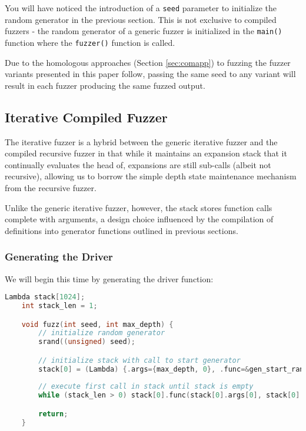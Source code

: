 \documentclass[8pt, twoside]{extarticle}
\begin{document}
You will have noticed the introduction of a \verb|seed| parameter to initialize the random generator in the previous section. This is not exclusive to compiled fuzzers - the random generator of a generic fuzzer is initialized in the \verb|main()| function where the \verb|fuzzer()| function is called. 

Due to the homologous approaches (Section \ref{sec:comapp}) to fuzzing the fuzzer variants presented in this paper follow, passing the same seed to any variant will result in each fuzzer producing the same fuzzed output.

\subsection{Iterative Compiled Fuzzer}

The iterative fuzzer is a hybrid between the generic iterative fuzzer and the compiled recursive fuzzer in that while it maintains an expansion stack that it continually evaluates the head of, expansions are still sub-calls (albeit not recursive), allowing us to borrow the simple depth state maintenance mechanism from the recursive fuzzer.

Unlike the generic iterative fuzzer, however, the stack stores function calls complete with arguments, a design choice influenced by the compilation of definitions into generator functions outlined in previous sections.

\subsubsection{Generating the Driver}

We will begin this time by generating the driver function:

\begin{lstlisting}[gobble=2, language=C, caption={Iterative compiled fuzzer driver}]
	Lambda stack[1024];
	int stack_len = 1;

	void fuzz(int seed, int max_depth) {
		// initialize random generator
		srand((unsigned) seed);

		// initialize stack with call to start generator
		stack[0] = (Lambda) {.args={max_depth, 0}, .func=&gen_start_rand};
		
		// execute first call in stack until stack is empty
		while (stack_len > 0) stack[0].func(stack[0].args[0], stack[0].args[1]);

		return;
	}
\end{lstlisting}
\end{document}

